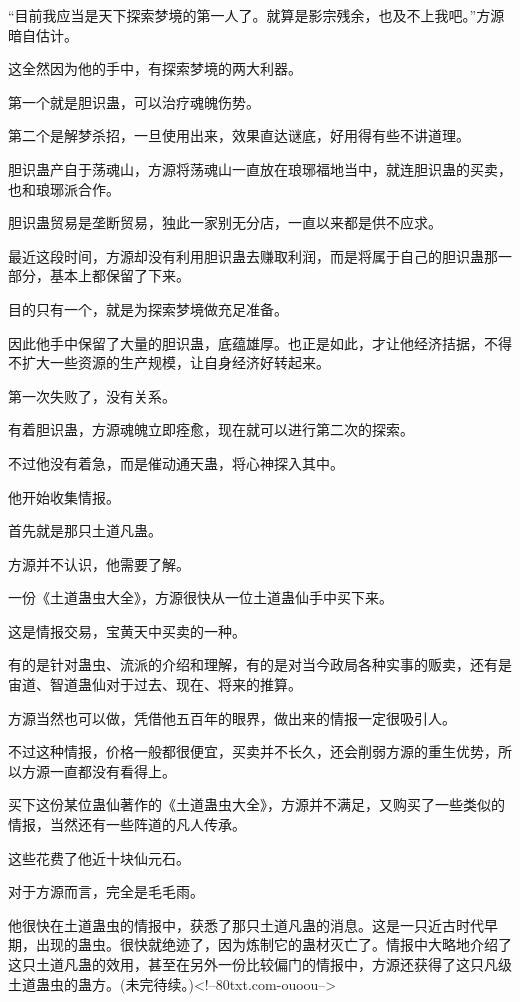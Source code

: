 \begin{this_body}
“目前我应当是天下探索梦境的第一人了。就算是影宗残余，也及不上我吧。”方源暗自估计。

这全然因为他的手中，有探索梦境的两大利器。

第一个就是胆识蛊，可以治疗魂魄伤势。

第二个是解梦杀招，一旦使用出来，效果直达谜底，好用得有些不讲道理。

胆识蛊产自于荡魂山，方源将荡魂山一直放在琅琊福地当中，就连胆识蛊的买卖，也和琅琊派合作。

胆识蛊贸易是垄断贸易，独此一家别无分店，一直以来都是供不应求。

最近这段时间，方源却没有利用胆识蛊去赚取利润，而是将属于自己的胆识蛊那一部分，基本上都保留了下来。

目的只有一个，就是为探索梦境做充足准备。

因此他手中保留了大量的胆识蛊，底蕴雄厚。也正是如此，才让他经济拮据，不得不扩大一些资源的生产规模，让自身经济好转起来。

第一次失败了，没有关系。

有着胆识蛊，方源魂魄立即痊愈，现在就可以进行第二次的探索。

不过他没有着急，而是催动通天蛊，将心神探入其中。

他开始收集情报。

首先就是那只土道凡蛊。

方源并不认识，他需要了解。

一份《土道蛊虫大全》，方源很快从一位土道蛊仙手中买下来。

这是情报交易，宝黄天中买卖的一种。

有的是针对蛊虫、流派的介绍和理解，有的是对当今政局各种实事的贩卖，还有是宙道、智道蛊仙对于过去、现在、将来的推算。

方源当然也可以做，凭借他五百年的眼界，做出来的情报一定很吸引人。

不过这种情报，价格一般都很便宜，买卖并不长久，还会削弱方源的重生优势，所以方源一直都没有看得上。

买下这份某位蛊仙著作的《土道蛊虫大全》，方源并不满足，又购买了一些类似的情报，当然还有一些阵道的凡人传承。

这些花费了他近十块仙元石。

对于方源而言，完全是毛毛雨。

他很快在土道蛊虫的情报中，获悉了那只土道凡蛊的消息。这是一只近古时代早期，出现的蛊虫。很快就绝迹了，因为炼制它的蛊材灭亡了。情报中大略地介绍了这只土道凡蛊的效用，甚至在另外一份比较偏门的情报中，方源还获得了这只凡级土道蛊虫的蛊方。(未完待续。)<!--80txt.com-ouoou-->

\end{this_body}

